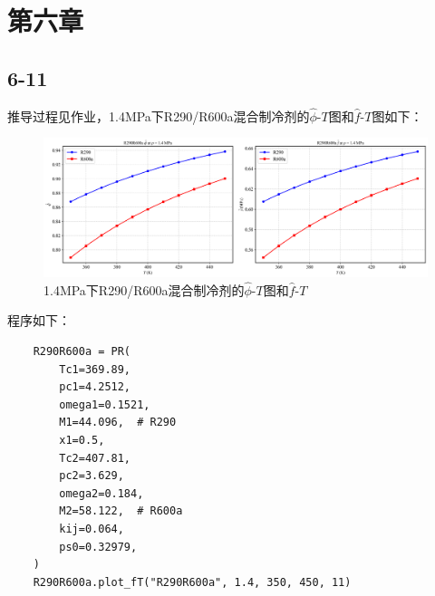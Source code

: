 \documentclass[12pt,a4paper]{article}
\begin{document}
\section*{第六章}
\subsection*{6-11}

推导过程见作业，1.4MPa下R290/R600a混合制冷剂的$\hat{\phi}$-$T$图和$\hat{f}$-$T$图如下：
\begin{figure}[H]
    \centering
    \includegraphics[width=1\textwidth]{R290R600a_f.png}
    \caption{1.4MPa下R290/R600a混合制冷剂的$\hat{\phi}$-$T$图和$\hat{f}$-$T$}
\end{figure}

程序如下：
\begin{lstlisting}
    R290R600a = PR(
        Tc1=369.89,
        pc1=4.2512,
        omega1=0.1521,
        M1=44.096,  # R290
        x1=0.5,
        Tc2=407.81,
        pc2=3.629,
        omega2=0.184,
        M2=58.122,  # R600a
        kij=0.064,
        ps0=0.32979,
    )
    R290R600a.plot_fT("R290R600a", 1.4, 350, 450, 11)
\end{lstlisting}
\end{document}

